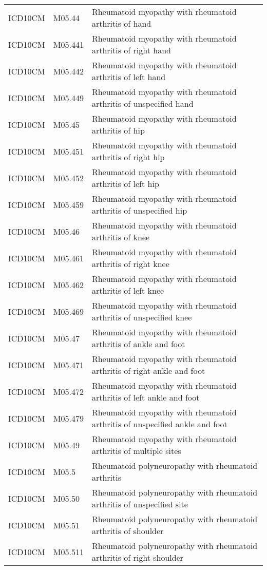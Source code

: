 \begin{table}[ht]
\begin{tabular}{lll}
  ICD10CM & M05.44 & Rheumatoid myopathy with rheumatoid arthritis of hand \\ 
  ICD10CM & M05.441 & Rheumatoid myopathy with rheumatoid arthritis of right hand \\ 
  ICD10CM & M05.442 & Rheumatoid myopathy with rheumatoid arthritis of left hand \\ 
  ICD10CM & M05.449 & Rheumatoid myopathy with rheumatoid arthritis of unspecified hand \\ 
  ICD10CM & M05.45 & Rheumatoid myopathy with rheumatoid arthritis of hip \\ 
  ICD10CM & M05.451 & Rheumatoid myopathy with rheumatoid arthritis of right hip \\ 
  ICD10CM & M05.452 & Rheumatoid myopathy with rheumatoid arthritis of left hip \\ 
  ICD10CM & M05.459 & Rheumatoid myopathy with rheumatoid arthritis of unspecified hip \\ 
  ICD10CM & M05.46 & Rheumatoid myopathy with rheumatoid arthritis of knee \\ 
  ICD10CM & M05.461 & Rheumatoid myopathy with rheumatoid arthritis of right knee \\ 
  ICD10CM & M05.462 & Rheumatoid myopathy with rheumatoid arthritis of left knee \\ 
  ICD10CM & M05.469 & Rheumatoid myopathy with rheumatoid arthritis of unspecified knee \\ 
  ICD10CM & M05.47 & Rheumatoid myopathy with rheumatoid arthritis of ankle and foot \\ 
  ICD10CM & M05.471 & Rheumatoid myopathy with rheumatoid arthritis of right ankle and foot \\ 
  ICD10CM & M05.472 & Rheumatoid myopathy with rheumatoid arthritis of left ankle and foot \\ 
  ICD10CM & M05.479 & Rheumatoid myopathy with rheumatoid arthritis of unspecified ankle and foot \\ 
  ICD10CM & M05.49 & Rheumatoid myopathy with rheumatoid arthritis of multiple sites \\ 
  ICD10CM & M05.5 & Rheumatoid polyneuropathy with rheumatoid arthritis \\ 
  ICD10CM & M05.50 & Rheumatoid polyneuropathy with rheumatoid arthritis of unspecified site \\ 
  ICD10CM & M05.51 & Rheumatoid polyneuropathy with rheumatoid arthritis of shoulder \\ 
  ICD10CM & M05.511 & Rheumatoid polyneuropathy with rheumatoid arthritis of right shoulder \\ 

\end{tabular}
\end{table}
